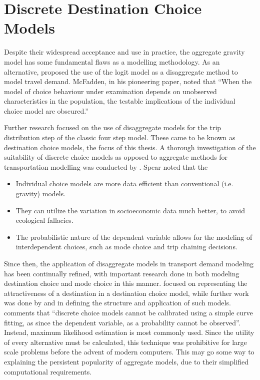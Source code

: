 \section{Discrete Destination Choice Models}
Despite their widespread acceptance and use in practice, the aggregate gravity model has some fundamental flaws as a modelling methodology. As an alternative, \textcite*{McFadden73, Akiva74} proposed the use of the logit model as a disaggregate method to model travel demand. McFadden, in his pioneering paper, noted that \enquote{When the model of choice behaviour under examination depends on unobserved characteristics in the population, the testable implications of the individual choice model are obscured.}\parencite{McFadden73}

Further research focused on the use of disaggregate models for the trip distribution step of the classic four step model. These came to be known as destination choice models, the focus of this thesis. A thorough investigation of the suitability of discrete choice models as opposed to aggregate methods for transportation modelling was conducted by \textcite{Spear77}. Spear noted that the 
\begin{itemize}
\item Individual choice models are more data efficient than conventional (i.e. gravity) models.
\item They can utilize the variation in socioeconomic data much better, to avoid ecological fallacies.
\item The probabilistic nature of the dependent variable allows for the modeling of interdependent choices, such as mode choice and trip chaining decisions. 
\end{itemize}
	
Since then, the application of disaggregate models in transport demand modeling has been continually refined, with important research done in both modeling destination choice and mode choice in this manner. \textcite{Daly82} focused on representing the attractiveness of a destination in a destination choice model, while further work was done by \textcite{Akiva74} and \textcite{Anas81} in defining the structure and application of such models. \textcite{Train09} comments that \enquote{discrete choice models cannot be calibrated using a simple curve fitting, as since the dependent variable, as a probability cannot be observed}. Instead, maximum likelihood estimation is most commonly used. Since the utility of every alternative must be calculated, this technique was prohibitive for large scale problems before the advent of modern computers. This may go some way to explaining the persistent popularity of aggregate models, due to their simplified computational requirements.

